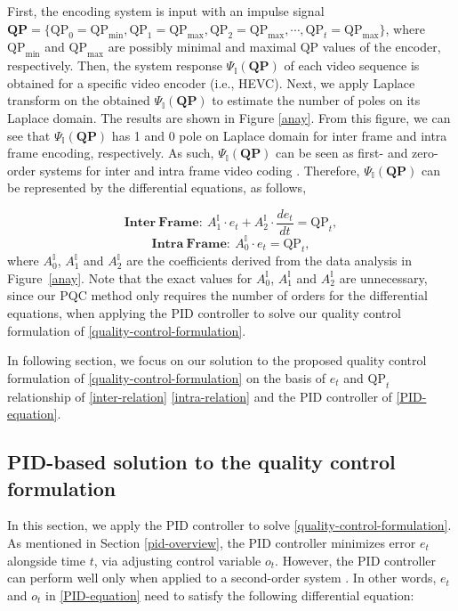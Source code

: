 \documentclass[smallabstract,smallcaptions]{dccpaper}
\begin{document}
First, the encoding system is input with an impulse signal $\mathbf{QP}=\lbrace \mathrm{QP}_{0}=\mathrm{QP}_{\mathrm{min}}, \mathrm{QP}_{1}=\mathrm{QP}_{\mathrm{max}}, \mathrm{QP}_{2}=\mathrm{QP}_{\mathrm{max}},\cdots,\mathrm{QP}_{t}=\mathrm{QP}_{\mathrm{max}} \rbrace$, where $\mathrm{QP}_{\mathrm{min}}$ and $\mathrm{QP}_{\mathrm{max}}$ are possibly minimal and maximal $\mathrm{QP}$ values of the encoder, respectively. Then, the system response $\Psi_\mathbb{I}(\mathbf{QP})$ of each video sequence is obtained for a specific video encoder (i.e., HEVC). Next, we apply Laplace transform on the obtained $\Psi_\mathbb{I}(\mathbf{QP})$ to estimate the number of poles on its Laplace domain. The results are shown in Figure \ref{anay}. From this figure, we can see that $\Psi_\mathbb{I}(\mathbf{QP})$ has 1 and 0 pole on Laplace domain for inter frame and intra frame encoding, respectively. As such, $\Psi_\mathbb{I}(\mathbf{QP})$ can be seen as first- and zero- order systems for inter and intra frame video coding \cite{widder2015laplace}\cite{dorf1998modern}. Therefore, $\Psi_\mathbb{I}(\mathbf{QP})$ can be represented by the differential equations, as follows,

\begin{equation}
\label{inter-relation}
\mathbf{Inter~Frame:~}A_1^\mathbb{I} \cdot e_t + A_2^\mathbb{I} \cdot \frac{de_t}{dt} = \mathrm{QP}_t,
\end{equation}
\begin{equation}
\label{intra-relation}
\mathbf{Intra~Frame:~}A_0^\mathbb{I} \cdot e_t = \mathrm{QP}_t,
\end{equation}
where $A_0^\mathbb{I}$, $A_1^\mathbb{I}$ and $A_2^\mathbb{I}$ are the coefficients derived from the data analysis in Figure~\ref{anay}. Note that the exact values for $A_0^\mathbb{I}$, $A_1^\mathbb{I}$ and $A_2^\mathbb{I}$ are unnecessary, since our PQC method only requires the number of orders for the differential equations, when applying the PID controller to solve our quality control formulation of \eqref{quality-control-formulation}.

In following section, we focus on our solution to the proposed quality control formulation of \eqref{quality-control-formulation} on the basis of $e_t$ and $\mathrm{QP}_{t}$ relationship of \eqref{inter-relation} \eqref{intra-relation} and the PID controller of \eqref{PID-equation}.
\vspace{-1.0em}
\subsection{PID-based solution to the quality control formulation}\label{Policy Function with PID Controller}
\vspace{-0.5em}
In this section, we apply the PID controller to solve \eqref{quality-control-formulation}. As mentioned in Section \ref{pid-overview}, the PID controller minimizes error $e_t$ alongside time $t$, via adjusting control variable $o_t$. However, the PID controller can perform well only when applied to a second-order system \cite{zhao2005fractional}. In other words, $e_t$ and $o_t$ in \eqref{PID-equation} need to satisfy the following differential equation:
\end{document}

